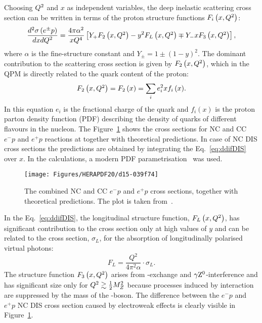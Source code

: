 Choosing $\mbox{${Q^2}$}$ and $x$ as independent variables, the deep inelastic scattering cross section can be written in terms of the proton structure functions $F_i\left(x,\mbox{${Q^2}$}\right)$:
\begin{equation}
\frac{d^2\sigma\left( e^\pm p \right) }{dxd\mbox{${Q^2}$}} = \frac{4\pi\alpha^2}{xQ^4}\left[ Y_+F_2\left(x,\mbox{${Q^2}$}\right) - y^2F_L\left(x,\mbox{${Q^2}$}\right) \mp Y_-xF_3\left(x,\mbox{${Q^2}$}\right) \right],
\label{eq:ddifDIS}
\end{equation}
where $\alpha$ is the fine-structure constant and $Y_\pm = 1 \pm \left( 1 - y \right)^2$. The dominant contribution to the scattering cross section is given by $F_2\left(x,\mbox{${Q^2}$}\right)$, which in the QPM is directly related to the quark content of the proton:
\begin{equation}
F_2\left(x,\mbox{${Q^2}$}\right) = F_2\left(x\right) = \sum_i{e_i^2xf_i\left(x\right)}.
\label{eq:f2pdf}
\end{equation}
In this equation $e_i$ is the fractional charge of the quark and $f_i\left(x\right)$ is the proton parton density function (PDF) describing the density of quarks of different flavours in the nucleon. The Figure~\ref{fig:d15-039f74} shows the \dsdqsq cross sections for NC and CC $e^-p$ and $e^+p$ reactions at \hera together with theoretical predictions. In case of NC DIS cross sections the predictions are obtained by integrating the Eq.~\eqref{eq:ddifDIS} over $x$. In the calculations, a modern PDF parametrisation~\cite{Abramowicz:2015mha} was used.
\begin{figure}[t!]
	\centering
		\texttt{[image: Figures/HERAPDF20/d15-039f74]}
	\caption{The combined \hera NC and CC $e^-p$ and $e^+p$ cross sections, \dsdqsq together with theoretical predictions. The plot is taken from~\protect\cite{Abramowicz:2015mha}.}
	\label{fig:d15-039f74}
\end{figure}

In the Eq.~\eqref{eq:ddifDIS}, the longitudinal structure function, $F_L\left(x,\mbox{${Q^2}$}\right)$, has significant contribution to the cross section only at high values of $y$ and can be related to the cross section, $\sigma_L$, for the absorption of longitudinally polarised virtual photons:
\begin{equation}
F_L = \frac{Q^2}{4\pi^2\alpha}\cdot \sigma_L.
\label{eq:sigmal}
\end{equation}
The structure function $F_3\left(x,\mbox{${Q^2}$}\right)$ arises from \zn-exchange and $\gamma\mbox{$\rm{Z}^0$}$-interference and has significant size only for $\mbox{${Q^2}$} \gtrsim \frac{1}{2}M^2_Z$ because processes induced by \zn interaction are suppressed by the mass of the \zn-boson. The difference between the $e^-p$ and $e^+p$ NC DIS cross section caused by electroweak effects is clearly visible in Figure~\ref{fig:d15-039f74}.

